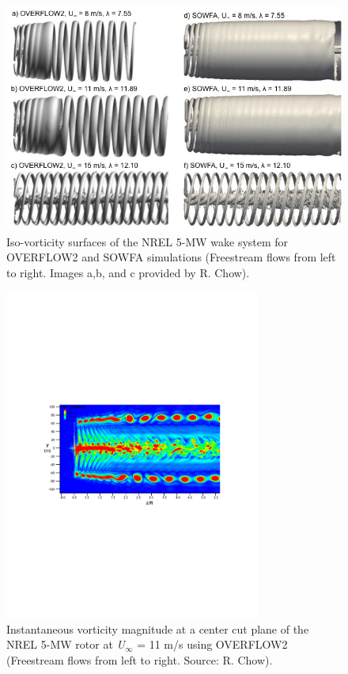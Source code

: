 \begin{figure}[htbp]
\centering
 \includegraphics[width=\textwidth]{Figures/ch5Figures/isoVorts}
 \caption{ Iso-vorticity surfaces of the NREL 5-MW wake system for OVERFLOW2 and SOWFA simulations (Freestream flows from left to right. Images a,b, and c provided by R. Chow).}
 \label{isoVort}
\end{figure}   

\begin{figure}[htbp]
\centering
 \includegraphics[width=0.75\textwidth]{Figures/ch5Figures/VortMag}
 \caption{ Instantaneous vorticity magnitude at a center cut plane of the NREL 5-MW rotor at \emph{U$_\infty$} = 11 m/s using OVERFLOW2 (Freestream flows from left to right. Source: R. Chow). }
 \label{vortMag}
\end{figure}   

